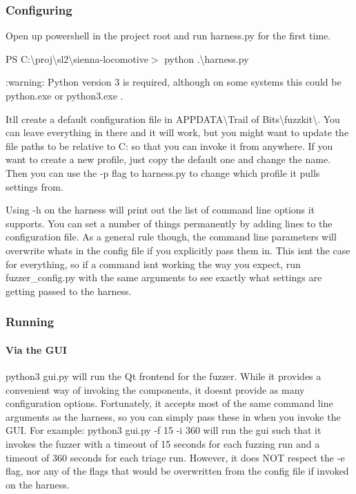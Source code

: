 \subsubsection*{Configuring}

Open up powershell in the project root and run harness.\+py for the first time.

{\ttfamily PS C\+:\textbackslash{}proj\textbackslash{}sl2\textbackslash{}sienna-\/locomotive$>$ python .\textbackslash{}harness.\+py}

\+:warning\+: Python version 3 is required, although on some systems this could be {\ttfamily python.\+exe} or {\ttfamily python3.\+exe} .

It\textquotesingle{}ll create a default configuration file in {\ttfamily A\+P\+P\+D\+A\+TA\textbackslash{}Trail of Bits\textbackslash{}fuzzkit\textbackslash{}}. You can leave everything in there and it will work, but you might want to update the file paths to be relative to C\+: so that you can invoke it from anywhere. If you want to create a new profile, just copy the default one and change the name. Then you can use the {\ttfamily -\/p} flag to harness.\+py to change which profile it pulls settings from.

Using -\/h on the harness will print out the list of command line options it supports. You can set a number of things permanently by adding lines to the configuration file. As a general rule though, the command line parameters will overwrite what\textquotesingle{}s in the config file if you explicitly pass them in. This isn\textquotesingle{}t the case for everything, so if a command isn\textquotesingle{}t working the way you expect, run fuzzer\+\_\+config.\+py with the same arguments to see exactly what settings are getting passed to the harness.

\subsubsection*{Running}

\paragraph*{Via the G\+UI}

{\ttfamily python3 gui.\+py} will run the Qt frontend for the fuzzer. While it provides a convenient way of invoking the components, it doesn\textquotesingle{}t provide as many configuration options. Fortunately, it accepts most of the same command line arguments as the harness, so you can simply pass these in when you invoke the G\+UI. For example\+: {\ttfamily python3 gui.\+py -\/f 15 -\/i 360} will run the gui such that it invokes the fuzzer with a timeout of 15 seconds for each fuzzing run and a timeout of 360 seconds for each triage run. However, it does N\+OT respect the -\/e flag, nor any of the flags that would be overwritten from the config file if invoked on the harness.

